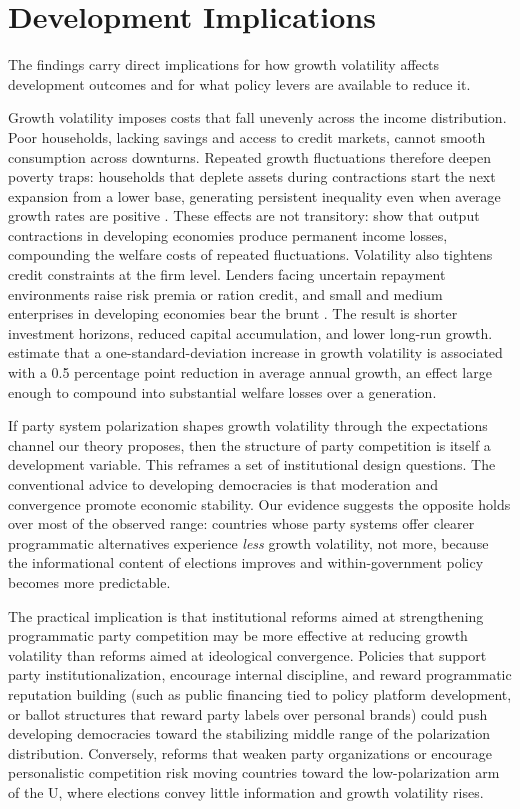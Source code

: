 \documentclass[12pt]{article}
\begin{document}
\section{Development Implications}

The findings carry direct implications for how growth volatility affects
development outcomes and for what policy levers are available to reduce it.

Growth volatility imposes costs that fall unevenly across the income
distribution. Poor households, lacking savings and access to credit markets,
cannot smooth consumption across downturns. Repeated growth fluctuations
therefore deepen poverty traps: households that deplete assets during
contractions start the next expansion from a lower base, generating
persistent inequality even when average growth rates are positive
\citep{Loayza2007, HnatkovskaLoayza2005, MalikTemple2009}. These effects are not transitory:
\citet{CerraSaxena2008} show that output contractions in developing
economies produce permanent income losses, compounding the welfare costs
of repeated fluctuations. Volatility also tightens credit constraints at
the firm level. Lenders facing uncertain repayment environments raise risk
premia or ration credit, and small and medium enterprises in developing
economies bear the brunt \citep{Aminou2024}. The result is shorter investment horizons, reduced capital
accumulation, and lower long-run growth. \citet{Ramey1995} estimate that a
one-standard-deviation increase in growth volatility is associated with a
0.5 percentage point reduction in average annual growth, an effect large
enough to compound into substantial welfare losses over a generation.

If party system polarization shapes growth volatility through the
expectations channel our theory proposes, then the structure of party
competition is itself a development variable. This reframes a set of
institutional design questions. The conventional advice to developing
democracies is that moderation and convergence promote economic stability.
Our evidence suggests the opposite holds over most of the observed range:
countries whose party systems offer clearer programmatic alternatives
experience \textit{less} growth volatility, not more, because the
informational content of elections improves and within-government policy
becomes more predictable.

The practical implication is that institutional reforms aimed at
strengthening programmatic party competition may be more effective at
reducing growth volatility than reforms aimed at ideological convergence.
Policies that support party institutionalization, encourage internal
discipline, and reward programmatic reputation building (such as public
financing tied to policy platform development, or ballot structures that
reward party labels over personal brands) could push developing democracies
toward the stabilizing middle range of the polarization distribution.
Conversely, reforms that weaken party organizations or encourage
personalistic competition risk moving countries toward the low-polarization
arm of the U, where elections convey little information and growth
volatility rises.
\end{document}

